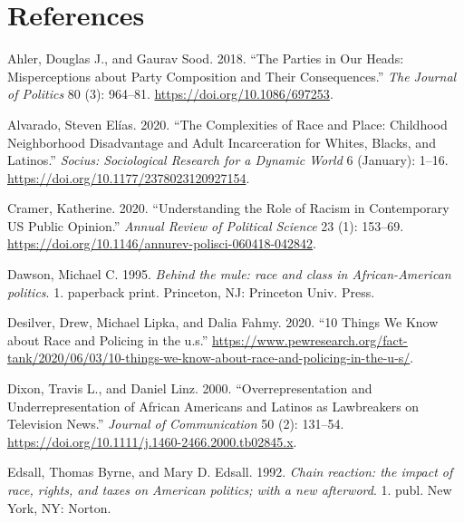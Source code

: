 \documentclass[
  12pt,
]{article}
\newlength{\cslhangindent}
\newlength{\cslentryspacingunit} %
\newenvironment{CSLReferences}[2] %
 {%
  \setlength{\parindent}{0pt}
  \ifodd #1
  \let\oldpar\par
  \def\par{\hangindent=\cslhangindent\oldpar}
  \fi
  \setlength{\parskip}{#2\cslentryspacingunit}
 }%
 {}
\begin{document}
\hypertarget{references}{%
\section*{References}\label{references}}

\hypertarget{refs}{}
\begin{CSLReferences}{1}{0}
\leavevmode{}%
Ahler, Douglas J., and Gaurav Sood. 2018. {``The Parties in Our Heads:
Misperceptions about Party Composition and Their Consequences.''}
\emph{The Journal of Politics} 80 (3): 964--81.
\url{https://doi.org/10.1086/697253}.

\leavevmode{}%
Alvarado, Steven Elías. 2020. {``The Complexities of Race and Place:
Childhood Neighborhood Disadvantage and Adult Incarceration for Whites,
Blacks, and Latinos.''} \emph{Socius: Sociological Research for a
Dynamic World} 6 (January): 1--16.
\url{https://doi.org/10.1177/2378023120927154}.

\leavevmode{}%
Cramer, Katherine. 2020. {``Understanding the Role of Racism in
Contemporary US Public Opinion.''} \emph{Annual Review of Political
Science} 23 (1): 153--69.
\url{https://doi.org/10.1146/annurev-polisci-060418-042842}.

\leavevmode{}%
Dawson, Michael C. 1995. \emph{Behind the mule: race and class in
African-American politics}. 1. paperback print. Princeton, NJ: Princeton
Univ. Press.

\leavevmode{}%
Desilver, Drew, Michael Lipka, and Dalia Fahmy. 2020. {``10 Things We
Know about Race and Policing in the u.s.''}
\url{https://www.pewresearch.org/fact-tank/2020/06/03/10-things-we-know-about-race-and-policing-in-the-u-s/}.

\leavevmode{}%
Dixon, Travis L., and Daniel Linz. 2000. {``Overrepresentation and
Underrepresentation of African Americans and Latinos as Lawbreakers on
Television News.''} \emph{Journal of Communication} 50 (2): 131--54.
\url{https://doi.org/10.1111/j.1460-2466.2000.tb02845.x}.

\leavevmode{}%
Edsall, Thomas Byrne, and Mary D. Edsall. 1992. \emph{Chain reaction:
the impact of race, rights, and taxes on American politics; with a new
afterword}. 1. publ. New York, NY: Norton.


\end{CSLReferences}
\end{document}
